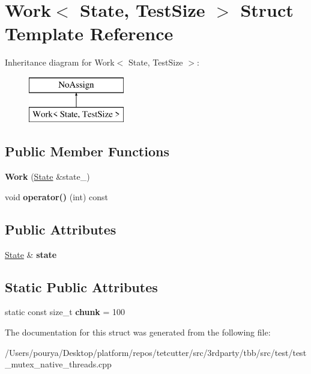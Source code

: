 \hypertarget{structWork}{}\section{Work$<$ State, Test\+Size $>$ Struct Template Reference}
\label{structWork}
Inheritance diagram for Work$<$ State, Test\+Size $>$\+:\begin{figure}[H]
\begin{center}
\leavevmode
\includegraphics[height=2.000000cm]{structWork}
\end{center}
\end{figure}
\subsection*{Public Member Functions}
\begin{DoxyCompactItemize}
\item 
\hypertarget{structWork_a8400408707b26248c5d68549baf8a688}{}{\bfseries Work} (\hyperlink{structState}{State} \&state\+\_\+)\label{structWork_a8400408707b26248c5d68549baf8a688}

\item 
\hypertarget{structWork_ad75d4d7416fde5f4986775b2004ee90a}{}void {\bfseries operator()} (int) const \label{structWork_ad75d4d7416fde5f4986775b2004ee90a}

\end{DoxyCompactItemize}
\subsection*{Public Attributes}
\begin{DoxyCompactItemize}
\item 
\hypertarget{structWork_a6f0371c17335e10fd963646cbadc055f}{}\hyperlink{structState}{State} \& {\bfseries state}\label{structWork_a6f0371c17335e10fd963646cbadc055f}

\end{DoxyCompactItemize}
\subsection*{Static Public Attributes}
\begin{DoxyCompactItemize}
\item 
\hypertarget{structWork_a424e7664e891804876334f483361cdb6}{}static const size\+\_\+t {\bfseries chunk} = 100\label{structWork_a424e7664e891804876334f483361cdb6}

\end{DoxyCompactItemize}


The documentation for this struct was generated from the following file\+:\begin{DoxyCompactItemize}
\item 
/\+Users/pourya/\+Desktop/platform/repos/tetcutter/src/3rdparty/tbb/src/test/test\+\_\+mutex\+\_\+native\+\_\+threads.\+cpp\end{DoxyCompactItemize}
